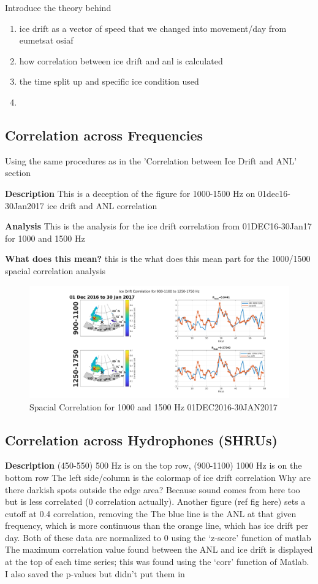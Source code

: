 Introduce the theory behind 
\begin{enumerate}
\item  ice drift as a vector of speed that we changed into movement/day from eumetsat osiaf
\item  how correlation between ice drift and anl is calculated
\item  the time split up and specific ice condition used
\item 
\end{enumerate}


\subsection{Correlation across Frequencies}
Using the same procedures as in the 'Correlation between Ice Drift and ANL' section

\textbf{Description}
This is a deception of the figure for 1000-1500 Hz on 01dec16-30Jan2017 ice drift and ANL correlation

\textbf{Analysis}
This is the analysis for the ice drift correlation from 01DEC16-30Jan17 for 1000 and 1500 Hz

\textbf{What does this mean?}
this is the what does this mean part for the 1000/1500 spacial correlation analysis

\begin{figure}[h]
\centering
\includegraphics[scale=0.4]{Figures/1000_1500_spatial_corr_20161201-20170130.png}
\caption{Spacial Correlation for 1000 and 1500 Hz 01DEC2016-30JAN2017}
\label{fig_1000_1500corr}
\end{figure}

\subsection{Correlation across Hydrophones (SHRUs)}

\textbf{Description}
(450-550) 500 Hz is on the top row, (900-1100) 1000 Hz is on the bottom row
The left side/column is the colormap of ice drift correlation
Why are there darkish spots outside the edge area? Because sound comes from here too but is less correlated (0 correlation actually). Another figure (ref fig here) sets a cutoff at 0.4 correlation, removing the 
The blue line is the ANL at that given frequency, which is more continuous than the orange line, which has ice drift per day. Both of these data are normalized to 0 using the ‘z-score’ function of matlab
The maximum correlation value found between the ANL and ice drift is displayed at the top of each time series; this was found using the ‘corr’ function of Matlab. I also saved the p-values but didn’t put them in

